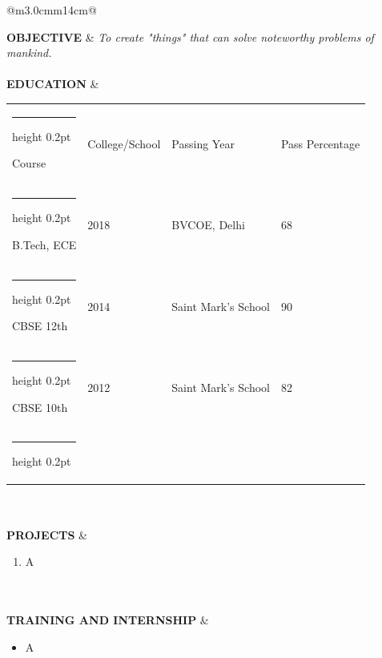 \documentclass[a4paper]{article}
\makeatletter
\newcommand{\thinhline}
{
	\noalign {\ifnum 0=`}\fi \hrule height 0.2pt
	\futurelet \reserved@a \@xhline
}
\makeatother
\begin{document}
		\begin{longtable}{@{}m{3.0cm}m{14cm}@{}}
		
			\textrm{\textbf {OBJECTIVE}} & \textit{To create "things" that can solve noteworthy problems of mankind.}
			\\ \\
					
		
			\textrm{\textbf {EDUCATION}} & 
				\begin{center}
					\begin{tabular}{ |m{4cm}| m{4cm}| m{2cm}| m{3cm}| }
						\thinhline
						{\begin{center} Course \end{center}} & {\begin{center} 
						College/School \end{center}} & {\begin{center} Passing Year \end{center}} 
						& {\begin{center} Pass Percentage \end{center}} \\
						\thinhline
    					B.Tech,  ECE & 2018 & BVCOE, Delhi  & 68\\ 
		    			\thinhline
    					CBSE 12th & {2014} & Saint Mark's School & 90\\
    					\thinhline
		    			CBSE 10th & 2012 & Saint Mark's School & 82\\
    					\thinhline
  					\end{tabular}
				\end{center}
			\\ \\
			
			
			\textrm{\textbf {PROJECTS}} & 
				\begin{enumerate}
					\itemsep -2pt
					\item
					A
				\end{enumerate}
			\\ \\
			
			
			\textrm{\textbf{TRAINING \newline AND \newline  INTERNSHIP}} & 
				\begin{itemize}
					\itemsep -2pt
					\item
					A
				\end{itemize}
			\\ \\
			

\end{longtable}
\end{document}
